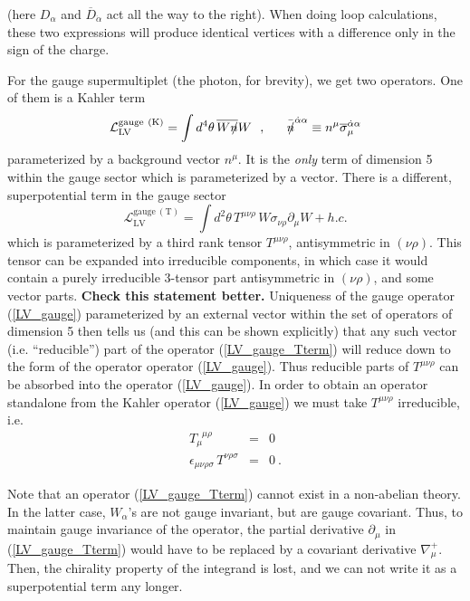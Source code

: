 \documentclass[a4paper,12pt]{article}
\newcommand{\slashed}[1]{\hbox{{$#1$}\llap{$/$}}}
\begin{document}
	(here $ D_\alpha $ and $ \overline{D}_{\dot{\alpha}} $
	act all the way to the right).
	When doing loop calculations, these two expressions will produce
	identical vertices with a difference only in the sign of the
	charge.

	For the gauge supermultiplet (the photon, for brevity), 
	we get two operators.
	One of them is a Kahler term
\begin{equation}
\label{LV_gauge}
	\mathcal{L}_{\mathrm{LV}}^{\mathrm{gauge\ (K)}} =
        \int d^4\theta \, \overline{W \slashed{n}}W    ~~,
         ~~~~~ \bar{\slashed{n}}^{\dot{\alpha}\alpha} \equiv
               n^\mu \overline{\sigma}_\mu^{\dot{\alpha}\alpha}
\end{equation}
	parameterized by a background vector $ n^\mu $.
	It is the {\it only} term of dimension 5 within the gauge
	sector which is parameterized by a vector. 
	There is a different, superpotential term in the gauge
	sector
\begin{equation}
\label{LV_gauge_Tterm}
	\mathcal{L}_{\mathrm{LV}}^{\mathrm{gauge\ (T)}} =
	\int d^2\theta \, T^{\mu\nu\rho} \,
	        W \sigma_{\nu\rho} \partial_\mu W  + h.c.
\end{equation}
	which is parameterized by a third rank tensor 
  $ T^{\mu\nu\rho} $,
	antisymmetric in $(\nu\rho)$.
        This tensor can be expanded into irreducible components,
	in which case it would contain a purely irreducible
	3-tensor part antisymmetric in
	$(\nu\rho)$, and some vector parts.
	{\bf Check this statement better.}
	Uniqueness of the gauge operator (\ref{LV_gauge}) parameterized
	by an external vector within the set of operators of dimension
	5 then tells us (and this can be shown
	explicitly) that any such vector (i.e. ``reducible'') part of 
	the operator (\ref{LV_gauge_Tterm}) will reduce down to
	the form of the operator operator (\ref{LV_gauge}).
	Thus reducible parts of $ T^{\mu\nu\rho} $ can be
	absorbed into the operator (\ref{LV_gauge}).
	In order to obtain an operator standalone from the Kahler
	operator (\ref{LV_gauge}) we must take
  $ T^{\mu\nu\rho} $
	irreducible, i.e.
\begin{eqnarray*}
	T_\mu^{\phantom{\mu}\mu\rho} & = & 0 \\
	\epsilon_{\mu\nu\rho\sigma}\, T^{\nu\rho\sigma} & = & 0~.
\end{eqnarray*}

	Note that an operator 
(\ref{LV_gauge_Tterm}) 
	cannot exist in a non-abelian theory. 
	In the latter case, $ W_\alpha $'s are not gauge invariant,
	but are gauge covariant.
	Thus, to maintain gauge invariance of the operator, the
	partial derivative $ \partial_\mu $ in 
	(\ref{LV_gauge_Tterm}) would have to be replaced by
	a covariant derivative $ \nabla_\mu^+ $. 
	Then, the chirality property of the integrand is lost,
	and we can not write it as a superpotential term any longer.
\end{document}
